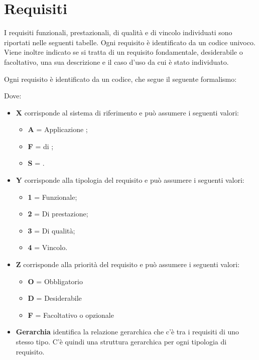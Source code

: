 \section{Requisiti }
I requisiti funzionali, prestazionali, di qualità e di vincolo individuati sono riportati nelle seguenti tabelle. Ogni requisito è identificato da un codice univoco.
Viene inoltre indicato se si tratta di un requisito fondamentale, desiderabile o facoltativo, una sua descrizione e il caso d'uso da cui è stato individuato. 

Ogni requisito è identificato da un codice, che segue il seguente formalismo:
\begin{center}
\end{center}

Dove:
\begin{itemize}
 \item \textbf{X} corrisponde al sistema di riferimento e può assumere i seguenti valori:
    \begin{itemize}
     \item[] \textbf{A} = Applicazione ;
     \item[] \textbf{F} =  di ;
     \item[] \textbf{S} = .
    \end{itemize}

 \item \textbf{Y} corrisponde alla tipologia del requisito e può assumere i seguenti valori:
    \begin{itemize}
     \item[] \textbf{1} = Funzionale;
     \item[] \textbf{2} = Di prestazione;
     \item[] \textbf{3} = Di qualità;
     \item[] \textbf{4} = Vincolo.
    \end{itemize}

 \item \textbf{Z} corrisponde alla priorità del requisito e può assumere i seguenti valori:
    \begin{itemize}
     \item[] \textbf{O} = Obbligatorio
     \item[] \textbf{D} = Desiderabile
     \item[] \textbf{F} = Facoltativo o opzionale
    \end{itemize}

 \item \textbf{Gerarchia} identifica la relazione gerarchica che c'è tra i requisiti di uno stesso tipo. C'è quindi una struttura gerarchica per ogni tipologia di requisito.
\end{itemize}

